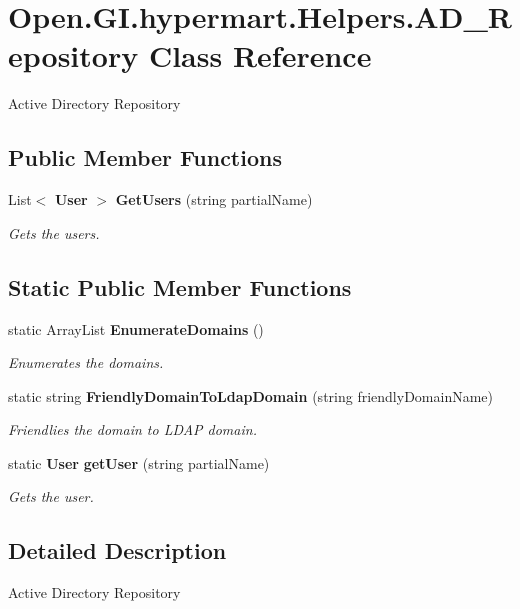 \section{Open.\+G\+I.\+hypermart.\+Helpers.\+A\+D\+\_\+\+Repository Class Reference}
\label{class_open_1_1_g_i_1_1hypermart_1_1_helpers_1_1_a_d___repository}


Active Directory Repository  


\subsection*{Public Member Functions}
\begin{DoxyCompactItemize}
\item 
List$<$ \textbf{ User} $>$ \textbf{ Get\+Users} (string partial\+Name)
\begin{DoxyCompactList}\small\item\em Gets the users. \end{DoxyCompactList}\end{DoxyCompactItemize}
\subsection*{Static Public Member Functions}
\begin{DoxyCompactItemize}
\item 
static Array\+List \textbf{ Enumerate\+Domains} ()
\begin{DoxyCompactList}\small\item\em Enumerates the domains. \end{DoxyCompactList}\item 
static string \textbf{ Friendly\+Domain\+To\+Ldap\+Domain} (string friendly\+Domain\+Name)
\begin{DoxyCompactList}\small\item\em Friendlies the domain to L\+D\+AP domain. \end{DoxyCompactList}\item 
static \textbf{ User} \textbf{ get\+User} (string partial\+Name)
\begin{DoxyCompactList}\small\item\em Gets the user. \end{DoxyCompactList}\end{DoxyCompactItemize}


\subsection{Detailed Description}
Active Directory Repository 



